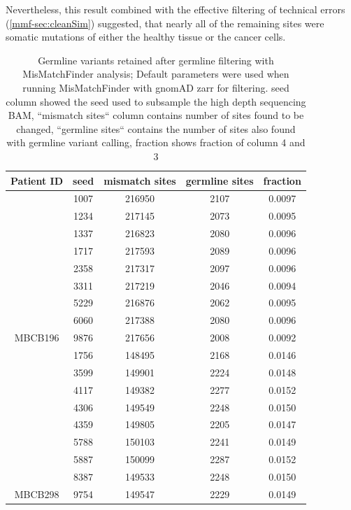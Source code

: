 Nevertheless, this result combined with the effective filtering of technical errors (\autoref{mmf-sec:cleanSim}) suggested, that nearly all of the remaining sites were somatic mutations of either the healthy tissue or the cancer cells.

\begin{table}
\caption[Germline variants retained after germline filtering]{Germline variants retained after germline filtering with MisMatchFinder analysis; Default parameters were used when running MisMatchFinder with gnomAD zarr for filtering. seed column showed the seed used to subsample the high depth sequencing BAM, ``mismatch sites`` column contains number of sites found to be changed, ``germline sites`` contains the number of sites also found with germline variant calling, fraction shows fraction of column 4 and 3}\label{tab:mmf-germlineArtifacts}
\centering
\begin{tabular}{|c|c|c|c|c|}
\toprule
\hline
\textbf{Patient ID} & \textbf{seed} & \textbf{mismatch sites} & \textbf{germline sites} & \textbf{fraction} \\
\hline
 & \num{1007} & \num{216950} &  \num{2107} & \num{0.0097}\\ 
 & \num{1234} & \num{217145} &  \num{2073} & \num{0.0095}\\ 
 & \num{1337} & \num{216823} &  \num{2080} & \num{0.0096}\\ 
 & \num{1717} & \num{217593} &  \num{2089} & \num{0.0096}\\ 
 & \num{2358} & \num{217317} &  \num{2097} & \num{0.0096}\\ 
 & \num{3311} & \num{217219} &  \num{2046} & \num{0.0094}\\ 
 & \num{5229} & \num{216876} &  \num{2062} & \num{0.0095}\\ 
 & \num{6060} & \num{217388} &  \num{2080} & \num{0.0096}\\ 
\multirow{-9}{*}{MBCB196} & \num{9876} & \num{217656} &  \num{2008} & \num{0.0092}\\ 
\hline
 & \num{1756} & \num{148495} &  \num{2168} & \num{0.0146}\\ 
 & \num{3599} & \num{149901} &  \num{2224} & \num{0.0148}\\ 
 & \num{4117} & \num{149382} &  \num{2277} & \num{0.0152}\\ 
 & \num{4306} & \num{149549} &  \num{2248} & \num{0.0150}\\ 
 & \num{4359} & \num{149805} &  \num{2205} & \num{0.0147}\\ 
 & \num{5788} & \num{150103} &  \num{2241} & \num{0.0149}\\ 
 & \num{5887} & \num{150099} &  \num{2287} & \num{0.0152}\\ 
 & \num{8387} & \num{149533} &  \num{2248} & \num{0.0150}\\ 
\multirow{-9}{*}{MBCB298} & \num{9754} & \num{149547} &  \num{2229} & \num{0.0149}\\
\hline
\bottomrule
\end{tabular}
\end{table}



